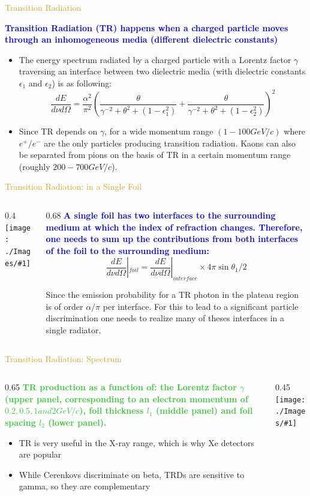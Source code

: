 \documentclass[11pt]{beamer} %
\renewcommand{\(}{\begin{columns}}
\renewcommand{\)}{\end{columns}}
\newcommand{\<}[1]{\begin{column}{#1}}
\renewcommand{\>}{\end{column}}
\newcommand{\itt}{\begin{itemize}}
\newcommand{\tti}{\end{itemize}}
\newcommand{\img}[1]{\texttt{[image: ./Images/\#1]}}
\newcommand{\hlt}[2]{\textcolor{#1}{\textbf{#2}}}
\begin{document}
\begin{frame}{\textcolor{Goldenrod}{Transition Radiation }}

  \hlt{Blue}{Transition Radiation (TR) happens when a charged particle moves through
    an inhomogeneous media (different dielectric constants)}
  
  \itt
\item The energy spectrum radiated by a charged particle with a Lorentz factor
  $\gamma$ traversing an interface between two dielectric media (with
  dielectric constants $\epsilon_1$ and $\epsilon_2$) is as following:
  \[
    \frac{dE}{d\nu d\Omega} =  \frac{\alpha^2}{\pi^2}
    (\frac{\theta}{\gamma^{-2}+\theta^2 +(1-\epsilon^2_1)} + \frac{\theta}{\gamma^{-2}+\theta^2 +(1-\epsilon^2_2)})^2
  \]
\item Since TR depends on $\gamma$, for a wide
  momentum range $(1-100 GeV/c)$ where $e^+/e^-$ are the
  only particles producing transition radiation. Kaons can also be
  separated from pions on the basis of TR in a certain momentum range
  (roughly $200 - 700 GeV/c$).
  \tti
\end{frame}  
\begin{frame}{\textcolor{Goldenrod}{Transition Radiation: in a Single
    Foil}}
\(
\<{0.4\textwidth}
\img{TRD_10}
\>
\<{0.68\textwidth}
\hlt{Blue}{A single foil has two interfaces to the surrounding medium at which
the index of refraction changes. Therefore, one needs to sum up the
contributions from both interfaces of the foil to the surrounding
medium:}
\[
  \frac{dE}{d\nu d\Omega} |_{foil} = \frac{dE}{d\nu d\Omega}
  |_{interface} \times 4\pi \sin\theta_1/2
\]

\alert{Since the emission probability for a TR photon in the plateau region is of
  order $\alpha/\pi$ per interface. For this to lead to a significant particle
  discrimination one needs to realize many of theses interfaces in a
  single radiator.}
\>
\)  
\end{frame}
\begin{frame}{\textcolor{Goldenrod}{Transition Radiation: Spectrum}}
\(
\<{0.65\textwidth}
\hlt{LimeGreen}{TR production as a function of: the Lorentz factor $\gamma$ (upper panel,
  corresponding to an electron momentum of $0.2, 0.5, 1 and 2 GeV/c$),
  foil thickness $l_1$ (middle panel) and foil spacing $l_2$ (lower
  panel).}
\itt
\item TR is very useful in the X-ray range, which is why Xe detectors are
  popular
\item \alert{While Cerenkovs discriminate on beta, TRDs are sensitive to
    gamma, so they are complementary}
  \tti
  \>
\<{0.45\textwidth}
\img{TRD_11}
\>
\)  
\end{frame}
\end{document}
